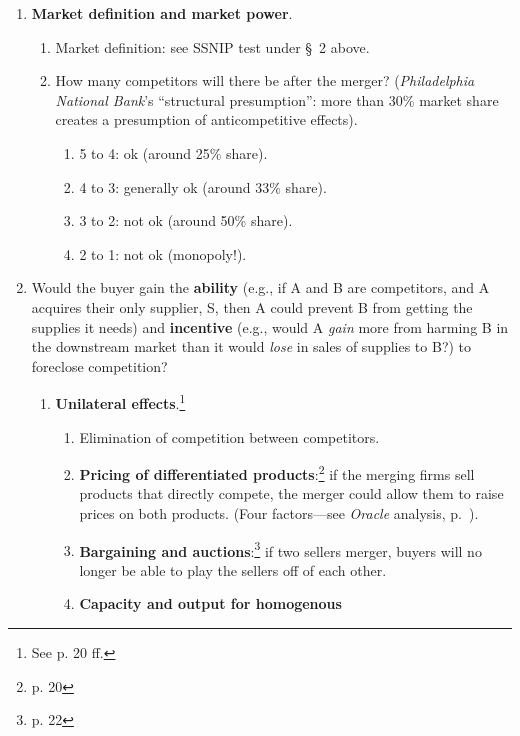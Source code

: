 \begin{enumerate}
    \item \textbf{Market definition and market power}.
    \begin{enumerate}
        \item Market definition: see SSNIP test under \S\ 2 above.
        \item How many competitors will there be after the merger? 
        (\emph{Philadelphia National Bank}'s ``structural presumption'': more 
        than 30\% market share creates a presumption of anticompetitive 
        effects).
        \begin{enumerate}
            \item 5 to 4: ok (around 25\% share).
            \item 4 to 3: generally ok (around 33\% share).
            \item 3 to 2: not ok (around 50\% share).
            \item 2 to 1: not ok (monopoly!).
        \end{enumerate}
    \end{enumerate}
    \item Would the buyer gain the \textbf{ability} (e.g., if A and B are 
    competitors, and A acquires their only supplier, S, then A could prevent B 
    from getting the supplies it needs) and \textbf{incentive} (e.g., would A 
    \emph{gain} more from harming B in the downstream market than it would 
    \emph{lose} in sales of supplies to B?) to foreclose competition?
    \begin{enumerate}
        \item \textbf{Unilateral effects}.\footnote{See p. 20 ff.}
        \begin{enumerate}
            \item Elimination of competition between competitors.
            \item \textbf{Pricing of differentiated products}:\footnote{p. 20} 
            if the merging firms sell products that directly compete, the 
            merger could allow them to raise prices on both products. (Four 
            factors---see \emph{Oracle} analysis, 
            p.~\pageref{oracle-unilateral-effects}).
            \item \textbf{Bargaining and auctions}:\footnote{p. 22} if two 
            sellers merger, buyers will no longer be able to play the sellers 
            off of each other.
            \item \textbf{Capacity and output for homogenous 
}
\end{enumerate}
\end{enumerate}
\end{enumerate}
